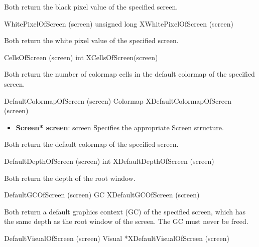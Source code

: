\documentclass{report}
\begin{document}
\begin{itemize}
            \bigbreak \noindent 
            Both return the black pixel value of the specified screen.
            \bigbreak \noindent 
            \begin{cppcode}
                WhitePixelOfScreen (screen)
                unsigned long XWhitePixelOfScreen (screen)
            \end{cppcode}
            \bigbreak \noindent 
            Both return the white pixel value of the specified screen.
            \bigbreak \noindent 
            \begin{cppcode}
                CellsOfScreen (screen)
                int XCellsOfScreen(screen)
            \end{cppcode}
            \bigbreak \noindent 
            Both return the number of colormap cells in the default colormap of the specified screen.
            \bigbreak \noindent 
            \begin{cppcode}
                DefaultColormapOfScreen (screen)
                Colormap XDefaultColormapOfScreen (screen)
            \end{cppcode}
            \bigbreak \noindent
            \begin{itemize}
                \item \textbf{Screen* screen}: screen Specifies the appropriate Screen structure.
            \end{itemize}
            Both return the default colormap of the specified screen.
            \bigbreak \noindent 
            \begin{cppcode}
                DefaultDepthOfScreen (screen)
                int XDefaultDepthOfScreen (screen)
            \end{cppcode}
            \bigbreak \noindent 
            Both return the depth of the root window.
            \bigbreak \noindent 
            \begin{cppcode}
                DefaultGCOfScreen (screen)
                GC XDefaultGCOfScreen (screen)
            \end{cppcode}
            \bigbreak \noindent 
            Both return a default graphics context (GC) of the specified screen, which has the same depth as the root window of the screen. The GC must never be freed.
            \bigbreak \noindent 
            \begin{cppcode}
                DefaultVisualOfScreen (screen)
                Visual *XDefaultVisualOfScreen (screen)
            \end{cppcode}
            \bigbreak \noindent 

\end{itemize}
\end{document}
